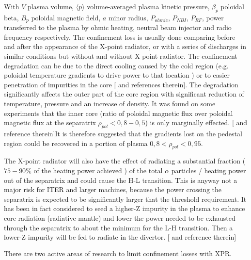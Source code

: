 With $V$ plasma volume, $\langle p \rangle$ volume-averaged plasma kinetic pressure, ${{ \beta }_{ p }}$ poloidal beta, $B_p$ poloidal magnetic field, $a$ minor radius, $P_{ohmic}$, $P_{NBI}$, $P_{RF}$, power transferred to the plasma by ohmic heating, neutral beam injector and radio frequency respectively. \cite{SalarElahi2010,Fallis2013} The confinement loss is usually done comparing before and after the appearance of the X-point radiator, or with a series of discharges in similar conditions but without and without X-point radiator.
The confinement degradation can be due to the direct cooling caused by the cold region (e.g. poloidal temperature gradients to drive power to that location \cite{Lipschultz1998} ) or to easier penetration of impurities in the core [\cite{Lipschultz2016} and references therein]. The degradation significantly affects the outer part of the core region with significant reduction of temperature, pressure and an increase of density. \cite{Kallenbach2015a}  It was found on some experiments that the inner core (ratio of poloidal magnetic flux over poloidal magnetic flux at the separatrix $ \rho _{pol}<0,8-0,5 $) is only marginally effected. [\cite{Reinke2013} and reference therein]It is therefore suggested that the gradients lost on the pedestal region could be recovered in a portion of plasma $0,8< \rho _{pol}<0,95$. \cite{Reimold2015}

The X-point radiator will also have the effect of radiating a substantial fraction ($75-90\%$ of the heating power achieved \cite{Bernert2017}) of the total $ \alpha $ particles / heating power out of the separatrix and could cause the H-L transition. This is anyway not a major risk for ITER and larger machines, because the power crossing the separatrix is expected to be significantly larger that the threshold requirement. It has been in fact considered to seed a higher-Z impurity in the plasma to enhance core radiation (radiative mantle) and lower the power needed to be exhausted through the separatrix to about the minimum for the L-H transition. Then a lower-Z impurity will be fed to radiate in the divertor. [\cite{Kallenbach2015a,Reinke2013} and reference therein]


There are two active areas of research to limit confinement losses with XPR.

